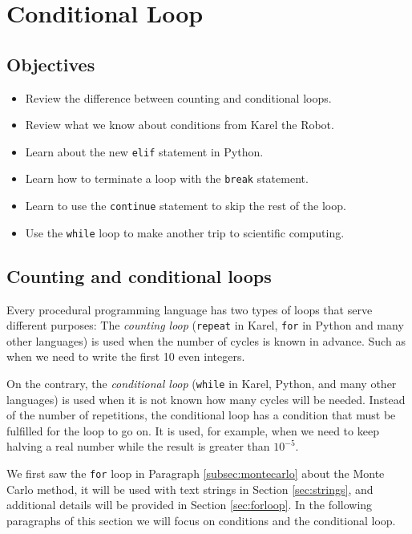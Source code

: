 \documentclass[article,A4,12pt]{llncs}
\begin{document}
\section{Conditional Loop} \label{sec:while}


\subsection{Objectives}

\begin{itemize}
\item Review the difference between counting and conditional loops.
\item Review what we know about conditions from Karel the Robot.
\item Learn about the new {\tt elif} statement in Python.
\item Learn how to terminate a loop with the {\tt break} statement.
\item Learn to use the {\tt continue} statement to skip the rest of the loop.
\item Use the {\tt while} loop to make another trip to scientific computing.
\end{itemize}

\subsection{Counting and conditional loops}

Every procedural programming language has two types of loops 
that serve different purposes: The {\em counting loop} ({\tt repeat} in Karel, 
{\tt for} in Python and many other languages) is used when the number of cycles 
is known in advance. Such as when we need to write the first 10 even integers. 

On the contrary, the {\em conditional loop} ({\tt while} in Karel, Python,
and many other languages) is used when it is not known how many cycles will be 
needed. Instead of the number of repetitions, the conditional loop has a condition 
that must be fulfilled for the loop to go on. It is used, for example, when we 
need to keep halving a real number while the result is greater than $10^{-5}$. 

We first saw the {\tt for} loop in Paragraph \ref{subsec:montecarlo} about the Monte Carlo method,
it will be used with text strings in Section \ref{sec:strings}, and additional details 
will be provided in Section \ref{sec:forloop}. In the following paragraphs of this section 
we will focus on conditions and the conditional loop.\\
\end{document}
